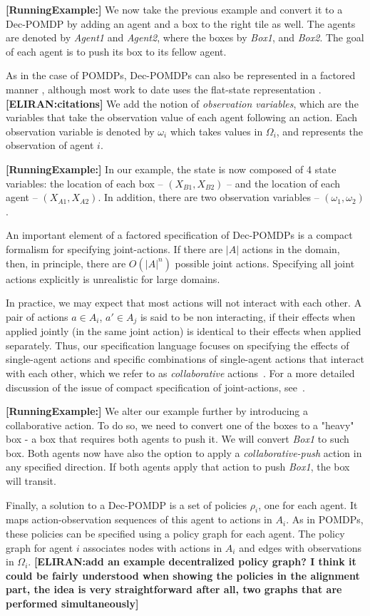 \documentclass[letterpaper]{article} %
\newcommand{\eliran}[1]{\textbf{[\color{red}ELIRAN:#1]}}
\newcommand{\RE}[1]{\textbf{[\color{purple}RunningExample:#1]}}
\begin{document}
\RE{}
We now take the previous example and convert it to a Dec-POMDP by adding an agent and a box to the right tile as well. The agents are denoted by \emph{Agent1} and \emph{Agent2}, where the boxes by \emph{Box1}, and \emph{Box2}. The goal of each agent is to push its box to its fellow agent.

As in the case of POMDPs, Dec-POMDPs can also be represented in a factored manner \cite{}, although most work to date uses the flat-state representation \cite{}.\eliran{citations}
We add the notion of \emph{observation variables}, which are the variables that take the observation value of each agent following an action. Each observation variable is denoted by $\omega_i$ which takes values in $\Omega_i$, and represents the observation of agent $i$.

\RE{}
In our example, the state is now composed of 4 state variables: the location of each box -- $(X_{B1}, X_{B2})$ -- and the location of each agent -- $(X_{A1}, X_{A2})$. In addition, there are two observation variables -- $(\omega_1, \omega_2)$.

An important element of a factored specification of Dec-POMDPs is a compact formalism for specifying joint-actions. If there are $|A|$ actions in the domain, then, in principle, there are $O(|A|^n)$ possible joint actions. Specifying all joint actions explicitly is unrealistic for large domains. 

In practice, we may expect
that most actions will not interact with each other. A pair of actions $a\in A_i$, $a' \in A_j$ is said to be non interacting, if their effects when applied jointly (in the same joint action) is identical to their effects when applied separately.
Thus, our specification language focuses on specifying
the effects of single-agent actions and specific
combinations of single-agent actions that interact with each other, which we refer to as {\em collaborative} actions~\cite{}. For a more detailed discussion of the issue
of compact specification of joint-actions, see~\cite{}. 

\RE{}
We alter our example further by introducing a collaborative action. To do so, we need to convert one of the boxes to a "heavy" box - a box that requires both agents to push it. We will convert \emph{Box1} to such box. Both agents now have also the option to apply a \emph{collaborative-push} action in any specified direction. If both agents apply that action to push \emph{Box1}, the box will transit.

Finally, a solution to a Dec-POMDP is a set of policies $\rho_i$, one for each agent. It maps action-observation sequences of this agent to actions in $A_i$.
As in POMDPs, these policies can be specified using a policy graph for each agent. The policy graph for agent $i$ associates nodes with actions in $A_i$
and edges with observations in $\Omega_i$. 
\eliran{add an example decentralized policy graph? I think it could be fairly understood when showing the policies in the alignment part, the idea is very straightforward after all, two graphs that are performed simultaneously}
\end{document}
